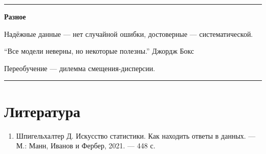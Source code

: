\documentclass[11pt,a4paper]{article}
\renewcommand{\linethickness}{0.1ex}
\providecommand{\tightlist}{%
      \setlength{\itemsep}{0pt}\setlength{\parskip}{0pt}}
\begin{document}
    \begin{center}\rule{0.5\linewidth}{\linethickness}\end{center}

    \textbf{Разное}

Надёжные данные --- нет случайной ошибки, достоверные ---
систематической.

``Все модели неверны, но некоторые полезны.'' Джордж Бокс

Переобучение --- дилемма смещения-дисперсии.

    \begin{center}\rule{0.5\linewidth}{\linethickness}\end{center}

    \hypertarget{ux43bux438ux442ux435ux440ux430ux442ux443ux440ux430}{%
\section{Литература}\label{ux43bux438ux442ux435ux440ux430ux442ux443ux440ux430}}

\begin{enumerate}
\def\labelenumi{\arabic{enumi}.}
\tightlist
\item
  Шпигельхалтер Д. Искусство статистики. Как находить ответы в данных.
  --- М.: Манн, Иванов и Фербер, 2021. --- 448 с.
\end{enumerate}


    
    
    
\end{document}
